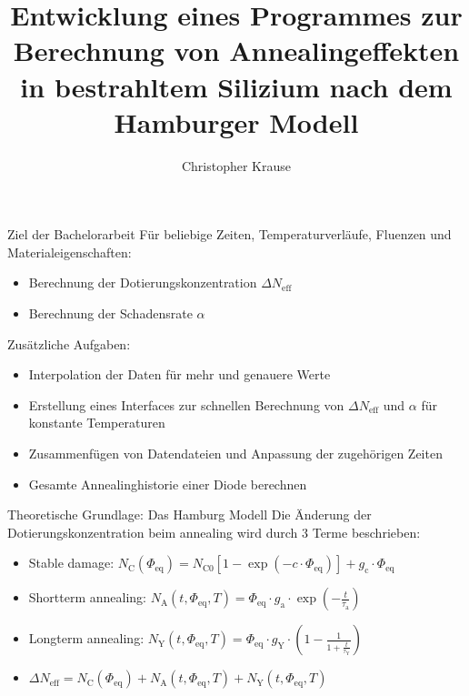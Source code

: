 \documentclass[aspectratio=1610, 9pt]{beamer}
\title{Entwicklung eines Programmes zur Berechnung von Annealingeffekten in bestrahltem Silizium nach dem Hamburger Modell}
\author[C.~Krause]{Christopher Krause}
\institute[E4]{Experimentelle Physik \\ Fakultät Physik}
\begin{document}
\maketitle

\begin{frame}{Ziel der Bachelorarbeit}
  Für beliebige Zeiten, Temperaturverläufe, Fluenzen und Materialeigenschaften:
  \begin{itemize}
    \item Berechnung der Dotierungskonzentration $\Delta N_{\mathrm{eff}}$
    \item Berechnung der Schadensrate $\alpha$
  \end{itemize}
  \medskip

  Zusätzliche Aufgaben:
  \begin{itemize}
    \item Interpolation der Daten für mehr und genauere Werte
    \item Erstellung eines Interfaces zur schnellen Berechnung von $\Delta N_{\mathrm{eff}}$ und $\alpha$
    für konstante Temperaturen
    \item Zusammenfügen von Datendateien und Anpassung der zugehörigen Zeiten
    \item Gesamte Annealinghistorie einer Diode berechnen
  \end{itemize}

\end{frame}

\begin{frame}{Theoretische Grundlage: Das Hamburg Modell}
  Die Änderung der Dotierungskonzentration beim annealing wird durch 3 Terme beschrieben:
  \medskip
  \begin{itemize}
    \item Stable damage:\: $N_{\mathrm{C}}(\Phi_{\mathrm{eq}}) = N_{\mathrm{C0}}[1-\exp{(-c \cdot \Phi_{\mathrm{eq}})}] + g_{\mathrm{c}} \cdot \Phi_{\mathrm{eq}}$
    \medskip
    \item Shortterm annealing:\: $N_{\mathrm{A}}(t, \Phi_{\mathrm{eq}}, T)= \Phi_{\mathrm{eq}} \cdot g_{\mathrm{a}} \cdot \exp{(-\frac{t}{\tau_{\mathrm{a}}})}$
    \medskip
    \item Longterm annealing:\: $N_{\mathrm{Y}}(t, \Phi_{\mathrm{eq}}, T)= \Phi_{\mathrm{eq}} \cdot g_{\mathrm{Y}} \cdot \left(1-\frac{1}{1+\frac{t}{\tau_{\mathrm{Y}}}}\right)$
    \medskip
    \item   $\Delta N_{\mathrm{eff}} = N_{\mathrm{C}}(\Phi_{\mathrm{eq}}) + N_{\mathrm{A}}(t, \Phi_{\mathrm{eq}}, T) + N_{\mathrm{Y}}(t, \Phi_{\mathrm{eq}}, T)$
  \end{itemize}
\end{frame}
\end{document}
